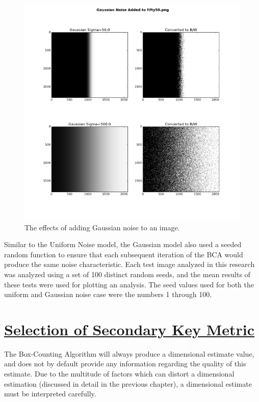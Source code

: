 \documentclass[12pt, oneside]{book}
\begin{document}
\begin{figure}[!b]
  \centering
  \includegraphics[width=\textwidth]{figures/gaussian.png}
  \caption[The effects of adding Gaussian noise to an image.]{The effects of adding Gaussian noise to an image.}
  \label{fig:gaussian}
\end{figure}

Similar to the Uniform Noise model, the Gaussian model also used a seeded random function to ensure that each subsequent iteration of the BCA would produce the same noise characteristic.  Each test image analyzed in this research was analyzed using a set of 100 distinct random seeds, and the mean results of these tests were used for plotting an analysis.  The seed values used for both the uniform and Gaussian noise case were the numbers 1 through 100.

% 
%
\section{\underline{Selection of Secondary Key Metric}} The Box-Counting Algorithm will always produce a dimensional estimate value, and does not by default provide any information regarding the quality of this estimate.  Due to the multitude of factors which can distort a dimensional estimation (discussed in detail in the previous chapter), a dimensional estimate must be interpreted carefully.
\end{document}
